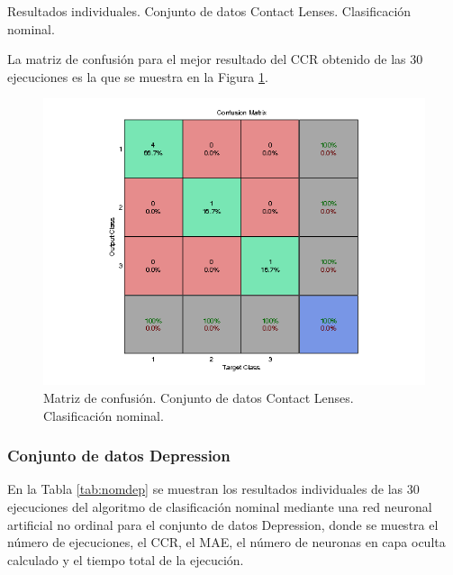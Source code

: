 			\begin{table}[!htbp]
				\centering
				\caption{Resultados individuales. Conjunto de datos Contact Lenses. Clasificación nominal.}
				\label{tab:nomcon}
			\end{table}
			
			La matriz de confusión para el mejor resultado del CCR obtenido de las 30 ejecuciones es la que se muestra en la Figura \ref{fig:nomcon}.
			
			\begin{figure}[htbp]
				\centering
				\includegraphics[scale=0.8]{../src/results/nominal/contact-lenses_mc2.png}
				\caption{Matriz de confusión. Conjunto de datos Contact Lenses. Clasificación nominal.}
				\label{fig:nomcon}
			\end{figure}

			\subsubsection{Conjunto de datos Depression}
			
			En la Tabla \ref{tab:nomdep} se muestran los resultados individuales de las 30 ejecuciones del algoritmo de clasificación nominal mediante una red neuronal artificial no ordinal para el conjunto de datos Depression, donde se muestra el número de ejecuciones, el CCR, el MAE, el número de neuronas en capa oculta calculado y el tiempo total de la ejecución.\\
			

